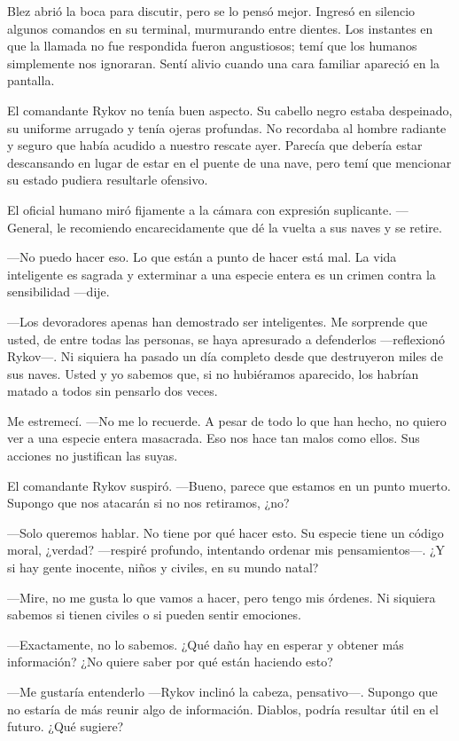 Blez abrió la boca para discutir, pero se lo pensó mejor. Ingresó en silencio algunos comandos en su terminal, murmurando entre dientes. Los instantes en que la llamada no fue respondida fueron angustiosos; temí que los humanos simplemente nos ignoraran. Sentí alivio cuando una cara familiar apareció en la pantalla.

El comandante Rykov no tenía buen aspecto. Su cabello negro estaba despeinado, su uniforme arrugado y tenía ojeras profundas. No recordaba al hombre radiante y seguro que había acudido a nuestro rescate ayer. Parecía que debería estar descansando en lugar de estar en el puente de una nave, pero temí que mencionar su estado pudiera resultarle ofensivo.

El oficial humano miró fijamente a la cámara con expresión suplicante. —General, le recomiendo encarecidamente que dé la vuelta a sus naves y se retire.

—No puedo hacer eso. Lo que están a punto de hacer está mal. La vida inteligente es sagrada y exterminar a una especie entera es un crimen contra la sensibilidad —dije.

—Los devoradores apenas han demostrado ser inteligentes. Me sorprende que usted, de entre todas las personas, se haya apresurado a defenderlos —reflexionó Rykov—. Ni siquiera ha pasado un día completo desde que destruyeron miles de sus naves. Usted y yo sabemos que, si no hubiéramos aparecido, los habrían matado a todos sin pensarlo dos veces.

Me estremecí. —No me lo recuerde. A pesar de todo lo que han hecho, no quiero ver a una especie entera masacrada. Eso nos hace tan malos como ellos. Sus acciones no justifican las suyas.

El comandante Rykov suspiró. —Bueno, parece que estamos en un punto muerto. Supongo que nos atacarán si no nos retiramos, ¿no?

—Solo queremos hablar. No tiene por qué hacer esto. Su especie tiene un código moral, ¿verdad? —respiré profundo, intentando ordenar mis pensamientos—. ¿Y si hay gente inocente, niños y civiles, en su mundo natal?

—Mire, no me gusta lo que vamos a hacer, pero tengo mis órdenes. Ni siquiera sabemos si tienen civiles o si pueden sentir emociones.

—Exactamente, no lo sabemos. ¿Qué daño hay en esperar y obtener más información? ¿No quiere saber por qué están haciendo esto?

—Me gustaría entenderlo —Rykov inclinó la cabeza, pensativo—. Supongo que no estaría de más reunir algo de información. Diablos, podría resultar útil en el futuro. ¿Qué sugiere?

